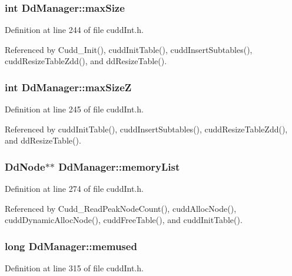 \subsubsection{\setlength{\rightskip}{0pt plus 5cm}int \bf{Dd\-Manager::max\-Size}}\label{structDdManager_a4d0701dc4e6f11b30085ae30c09fab6}




Definition at line 244 of file cudd\-Int.h.

Referenced by Cudd\_\-Init(), cudd\-Init\-Table(), cudd\-Insert\-Subtables(), cudd\-Resize\-Table\-Zdd(), and dd\-Resize\-Table().
\subsubsection{\setlength{\rightskip}{0pt plus 5cm}int \bf{Dd\-Manager::max\-Size\-Z}}\label{structDdManager_4a0b8f95d02bc99557fb55140e9b0963}




Definition at line 245 of file cudd\-Int.h.

Referenced by cudd\-Init\-Table(), cudd\-Insert\-Subtables(), cudd\-Resize\-Table\-Zdd(), and dd\-Resize\-Table().
\subsubsection{\setlength{\rightskip}{0pt plus 5cm}\bf{Dd\-Node}$\ast$$\ast$ \bf{Dd\-Manager::memory\-List}}\label{structDdManager_cd1165476d9c94202b6bf5b14fd0dd88}




Definition at line 274 of file cudd\-Int.h.

Referenced by Cudd\_\-Read\-Peak\-Node\-Count(), cudd\-Alloc\-Node(), cudd\-Dynamic\-Alloc\-Node(), cudd\-Free\-Table(), and cudd\-Init\-Table().
\subsubsection{\setlength{\rightskip}{0pt plus 5cm}long \bf{Dd\-Manager::memused}}\label{structDdManager_b0695ff63c3420eb72139b15796a97bb}




Definition at line 315 of file cudd\-Int.h.

